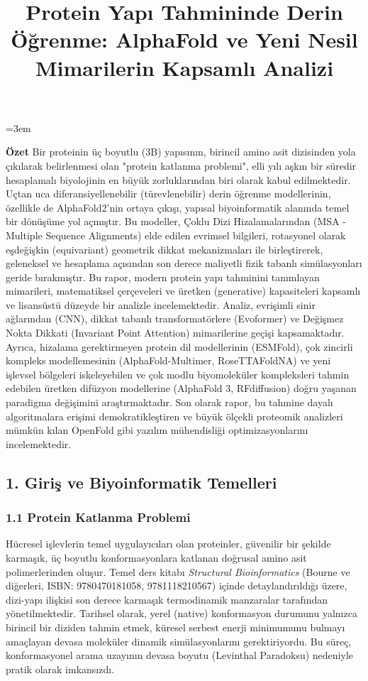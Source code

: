 \documentclass[11pt,a4paper]{article}
\begin{document}
\emergencystretch=3em

\title{Protein Yapı Tahmininde Derin Öğrenme: AlphaFold ve Yeni Nesil Mimarilerin Kapsamlı Analizi}
\author{}
\date{}
\maketitle

\textbf{Özet} Bir proteinin üç boyutlu (3B) yapısının, birincil amino asit dizisinden yola çıkılarak belirlenmesi olan "protein katlanma problemi", elli yılı aşkın bir süredir hesaplamalı biyolojinin en büyük zorluklarından biri olarak kabul edilmektedir. Uçtan uca diferansiyellenebilir (türevlenebilir) derin öğrenme modellerinin, özellikle de AlphaFold2'nin ortaya çıkışı, yapısal biyoinformatik alanında temel bir dönüşüme yol açmıştır. Bu modeller, Çoklu Dizi Hizalamalarından (MSA - Multiple Sequence Alignments) elde edilen evrimsel bilgileri, rotasyonel olarak eşdeğişkin (equivariant) geometrik dikkat mekanizmaları ile birleştirerek, geleneksel ve hesaplama açısından son derece maliyetli fizik tabanlı simülasyonları geride bırakmıştır. Bu rapor, modern protein yapı tahminini tanımlayan mimarileri, matematiksel çerçeveleri ve üretken (generative) kapasiteleri kapsamlı ve lisansüstü düzeyde bir analizle incelemektedir. Analiz, evrişimli sinir ağlarından (CNN), dikkat tabanlı transformatörlere (Evoformer) ve Değişmez Nokta Dikkati (Invariant Point Attention) mimarilerine geçişi kapsamaktadır. Ayrıca, hizalama gerektirmeyen protein dil modellerinin (ESMFold), çok zincirli kompleks modellemesinin (AlphaFold-Multimer, RoseTTAFoldNA) ve yeni işlevsel bölgeleri iskeleyebilen ve çok modlu biyomoleküler kompleksleri tahmin edebilen üretken difüzyon modellerine (AlphaFold 3, RFdiffusion) doğru yaşanan paradigma değişimini araştırmaktadır. Son olarak rapor, bu tahmine dayalı algoritmalara erişimi demokratikleştiren ve büyük ölçekli proteomik analizleri mümkün kılan OpenFold gibi yazılım mühendisliği optimizasyonlarını incelemektedir.

\subsection{1. Giriş ve Biyoinformatik Temelleri}
\subsubsection{1.1 Protein Katlanma Problemi}
Hücresel işlevlerin temel uygulayıcıları olan proteinler, güvenilir bir şekilde karmaşık, üç boyutlu konformasyonlara katlanan doğrusal amino asit polimerlerinden oluşur. Temel ders kitabı \textit{Structural Bioinformatics} (Bourne ve diğerleri, ISBN: 9780470181058, 9781118210567) içinde detaylandırıldığı üzere, dizi-yapı ilişkisi son derece karmaşık termodinamik manzaralar tarafından yönetilmektedir. Tarihsel olarak, yerel (native) konformasyon durumunu yalnızca birincil bir diziden tahmin etmek, küresel serbest enerji minimumunu bulmayı amaçlayan devasa moleküler dinamik simülasyonlarını gerektiriyordu. Bu süreç, konformasyonel arama uzayının devasa boyutu (Levinthal Paradoksu) nedeniyle pratik olarak imkansızdı.
\end{document}
